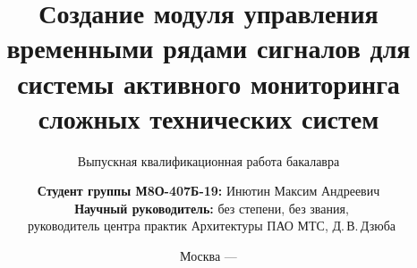 \title{Создание модуля управления временными рядами сигналов для системы активного мониторинга сложных технических систем}

\subtitle{Выпускная квалификационная работа бакалавра}


\author[Инютин Максим Андреевич]
{
	\textbf{Студент группы М8О-407Б-19:} Инютин Максим Андреевич\\
	\ \textbf{Научный руководитель:} без степени, без звания,\\\ руководитель центра практик Архитектуры ПАО МТС, Д.\,В.\,Дзюба
}


\date{Москва --- \the\year}


